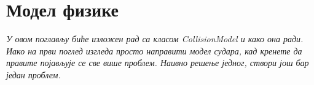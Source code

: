 \chapter{Модел физике} \label{Collision}
\emph{У овом поглављу биће изложен рад са класом CollisionModel и како она ради. Иако на први поглед изгледа просто направити модел судара, кад кренете да правите појављује се све више проблем. Наивно решење једног, створи још бар један проблем. }

